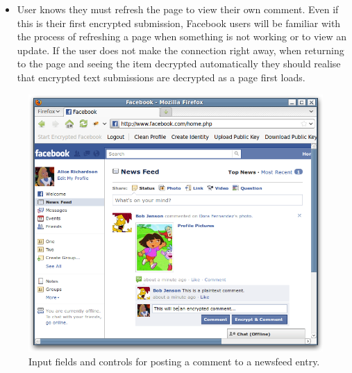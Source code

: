 \begin{desc}
\begin{itemize}
            \item User knows they must refresh the page to view their own comment. Even if this is their first encrypted submission, Facebook users will be familiar with the process of refreshing a page when something is not working or to view an update. If the user does not make the connection right away, when returning to the page and seeing the item decrypted automatically they should realise that encrypted text submissions are decrypted as a page first loads.
        
        \end{itemize}
\end{desc}


    \begin{figure}[tbph]
        \begin{center}
        
                \includegraphics[width=12cm]{screens/comment.png}

            \caption{Input fields and controls for posting a comment to a newsfeed entry.}
            \label{scn:comment}
        \end{center}
    \end{figure}
